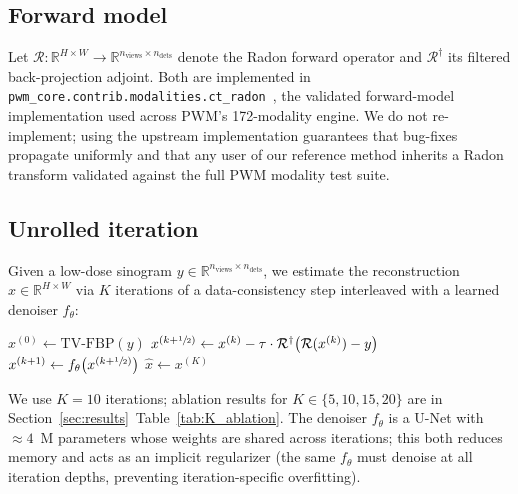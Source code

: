 \documentclass{article}  %
\newcommand{\R}{\mathbb{R}}
\begin{document}
\subsection{Forward model}

Let $\mathcal{R}: \R^{H \times W} \to \R^{n_{\textrm{views}} \times n_{\textrm{dets}}}$ denote the Radon forward operator and $\mathcal{R}^\dagger$ its filtered back-projection adjoint. Both are implemented in \texttt{pwm\_core.contrib.modalities.ct\_radon}~\citep{pwmcore}, the validated forward-model implementation used across PWM's 172-modality engine. We do not re-implement; using the upstream implementation guarantees that bug-fixes propagate uniformly and that any user of our reference method inherits a Radon transform validated against the full PWM modality test suite.

\subsection{Unrolled iteration}

Given a low-dose sinogram $y \in \R^{n_{\textrm{views}} \times n_{\textrm{dets}}}$, we estimate the reconstruction $\hat{x} \in \R^{H \times W}$ via $K$ iterations of a data-consistency step interleaved with a learned denoiser $f_\theta$:

\begin{algorithm}[h]
    \caption{Unrolled iterative reconstruction}
    \label{alg:unrolled}
    \begin{algorithmic}[1]
        \State $x^{(0)} \gets \textrm{TV-FBP}(y)$ 
            \State $x^{(k+\sfrac{1}{2})} \gets x^{(k)} - \tau \cdot \mathcal{R}^\dagger \!\left( \mathcal{R}(x^{(k)}) - y \right)$ 
            \State $x^{(k+1)} \gets f_\theta\!\left( x^{(k+\sfrac{1}{2})} \right)$ 
        \EndFor
        \State \Return $\hat{x} \gets x^{(K)}$
    \end{algorithmic}
\end{algorithm}

We use $K = 10$ iterations; ablation results for $K \in \{5, 10, 15, 20\}$ are in Section~\ref{sec:results}~Table~\ref{tab:K_ablation}. The denoiser $f_\theta$ is a U-Net with $\approx 4$~M parameters whose weights are shared across iterations; this both reduces memory and acts as an implicit regularizer (the same $f_\theta$ must denoise at all iteration depths, preventing iteration-specific overfitting).
\end{document}
